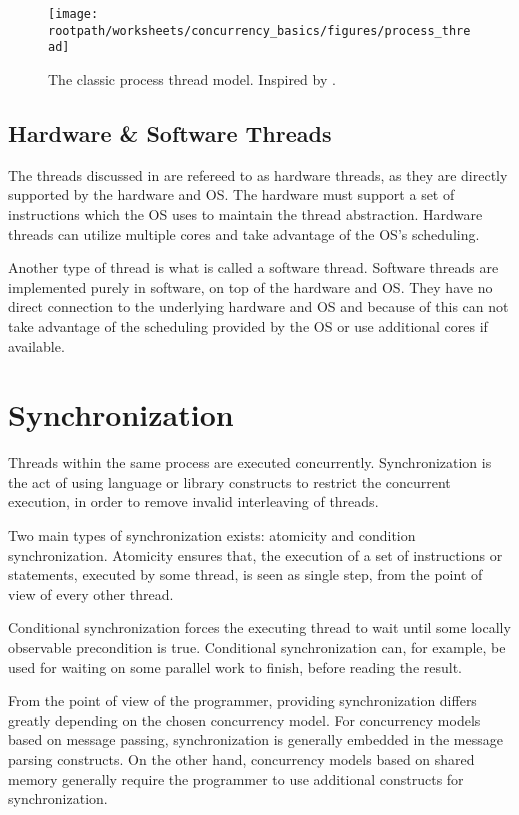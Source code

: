 \begin{figure}[htbp]
\centering
 \texttt{[image: \\rootpath/worksheets/concurrency\_basics/figures/process\_thread]} 
 \caption{The classic process thread model. Inspired by \cite[p. 99]{tanenbaum2008modern}.}
\label{fig:classic_process_thread}
\end{figure}


\subsection{Hardware \& Software Threads}
The threads discussed in  are refereed to as hardware threads, as they are directly supported by the hardware and \ac{OS}. The hardware must support a set of instructions which the \ac{OS} uses to maintain the thread abstraction. Hardware threads can utilize multiple cores and take advantage of the \ac{OS}'s scheduling.

Another type of thread is what is called a software thread. Software threads are implemented purely in software, on top of the hardware and \ac{OS}. They have no direct connection to the underlying hardware and \ac{OS} and because of this can not take advantage of the scheduling provided by the \ac{OS} or use additional cores if available. 

\section{Synchronization}\label{sec:synchronization}
Threads within the same process are executed concurrently. Synchronization is the act of using language or library constructs to restrict the concurrent execution, in order to remove invalid interleaving of threads\cite[p. 1989]{scott2011sync}.

Two main types of synchronization exists: atomicity and condition synchronization. Atomicity ensures that, the execution of a set of instructions or statements, executed by some thread, is seen as single step, from the point of view of every other thread\cite[p. 1989]{scott2011sync}.

Conditional synchronization forces the executing thread to wait until some locally observable precondition is true\cite[p. 1989]{scott2011sync}. Conditional synchronization can, for example, be used for waiting on some parallel work to finish, before reading the result.

From the point of view of the programmer, providing synchronization differs greatly depending on the chosen concurrency model. For concurrency models based on message passing, synchronization is generally embedded in the message parsing constructs. On the other hand, concurrency models based on shared memory generally require the programmer to use additional constructs for synchronization\cite[p. 1989]{scott2011sync}.

